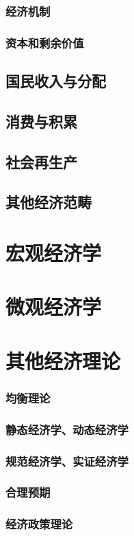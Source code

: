 \documentclass[UTF8]{../../RepresentationUniverse}
\begin{document}
        \subsubsection{经济机制}
        \subsubsection{资本和剩余价值}
    \subsection{国民收入与分配}
    \subsection{消费与积累}
    \subsection{社会再生产}
    \subsection{其他经济范畴}
\section{宏观经济学}
\section{微观经济学}
\section{其他经济理论}
    \subsubsection{均衡理论}
    \subsubsection{静态经济学、动态经济学}
    \subsubsection{规范经济学、实证经济学}
    \subsubsection{合理预期}
    \subsubsection{经济政策理论}
\end{document}
